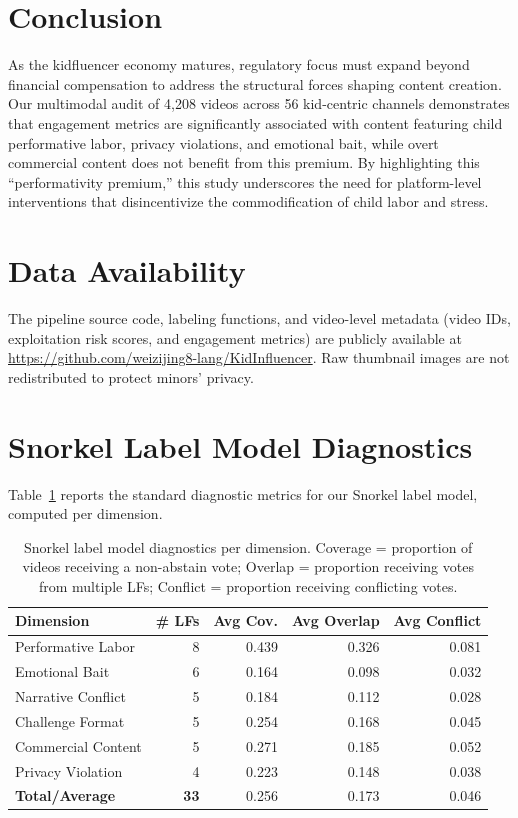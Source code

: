 \documentclass[]{ieeeaccess}
\begin{document}
\section{Conclusion}

As the kidfluencer economy matures, regulatory focus must expand beyond financial compensation to address the structural forces shaping content creation. Our multimodal audit of 4,208 videos across 56 kid-centric channels demonstrates that engagement metrics are significantly associated with content featuring child performative labor, privacy violations, and emotional bait, while overt commercial content does not benefit from this premium. By highlighting this ``performativity premium,'' this study underscores the need for platform-level interventions that disincentivize the commodification of child labor and stress.

\section*{Data Availability}
The pipeline source code, labeling functions, and video-level metadata (video IDs, exploitation risk scores, and engagement metrics) are publicly available at \url{https://github.com/weizijing8-lang/KidInfluencer}. Raw thumbnail images are not redistributed to protect minors' privacy.

\appendices
\section{Snorkel Label Model Diagnostics}
\label{app:diagnostics}

Table~\ref{tab:diagnostics} reports the standard diagnostic metrics for our Snorkel label model, computed per dimension.

\begin{table}[!ht]
\centering
\begin{tabular}{lrrrr}
\toprule
\textbf{Dimension} & \textbf{\# LFs} & \textbf{Avg Cov.} & \textbf{Avg Overlap} & \textbf{Avg Conflict} \\
\midrule
Performative Labor & 8 & 0.439 & 0.326 & 0.081 \\
Emotional Bait & 6 & 0.164 & 0.098 & 0.032 \\
Narrative Conflict & 5 & 0.184 & 0.112 & 0.028 \\
Challenge Format & 5 & 0.254 & 0.168 & 0.045 \\
Commercial Content & 5 & 0.271 & 0.185 & 0.052 \\
Privacy Violation & 4 & 0.223 & 0.148 & 0.038 \\
\midrule
\textbf{Total/Average} & \textbf{33} & 0.256 & 0.173 & 0.046 \\
\bottomrule
\end{tabular}
\caption{Snorkel label model diagnostics per dimension. Coverage = proportion of videos receiving a non-abstain vote; Overlap = proportion receiving votes from multiple LFs; Conflict = proportion receiving conflicting votes.}
\label{tab:diagnostics}
\end{table}
\end{document}
